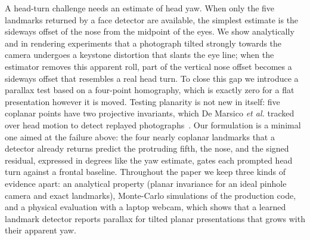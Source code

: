 \documentclass{ieeeaccess}
\begin{document}
A head-turn challenge needs an estimate of head yaw. When only the five landmarks returned by a face detector are available, the simplest estimate is the sideways offset of the nose from the midpoint of the eyes. We show analytically and in rendering experiments that a photograph tilted strongly towards the camera undergoes a keystone distortion that slants the eye line; when the estimator removes this apparent roll, part of the vertical nose offset becomes a sideways offset that resembles a real head turn. To close this gap we introduce a parallax test based on a four-point homography, which is exactly zero for a flat presentation however it is moved. Testing planarity is not new in itself: five coplanar points have two projective invariants, which De Marsico \emph{et al.} tracked over head motion to detect replayed photographs~\cite{demarsico2012projective}. Our formulation is a minimal one aimed at the failure above: the four nearly coplanar landmarks that a detector already returns predict the protruding fifth, the nose, and the signed residual, expressed in degrees like the yaw estimate, gates each prompted head turn against a frontal baseline. Throughout the paper we keep three kinds of evidence apart: an analytical property (planar invariance for an ideal pinhole camera and exact landmarks), Monte-Carlo simulations of the production code, and a physical evaluation with a laptop webcam, which shows that a learned landmark detector reports parallax for tilted planar presentations that grows with their apparent yaw.
\end{document}
